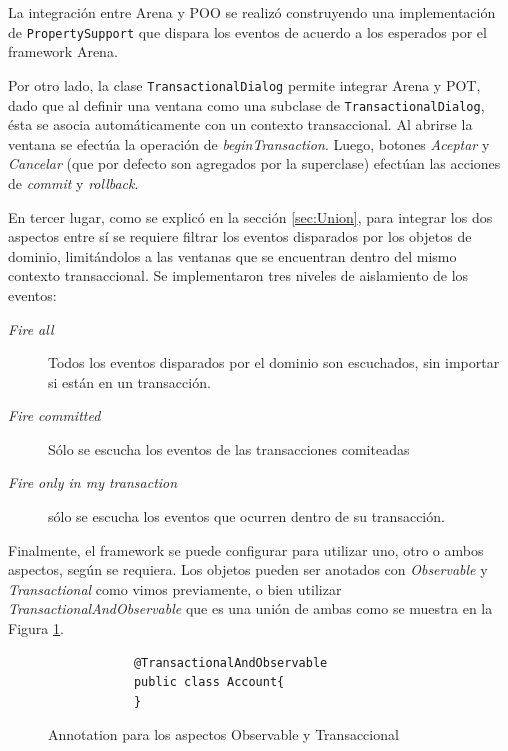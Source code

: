 La integración entre Arena y POO se realizó construyendo una implementación de
\lstinline|PropertySupport| que dispara los eventos de acuerdo a los esperados
por el framework Arena.

\medskip
Por otro lado, la clase \lstinline|TransactionalDialog| permite integrar Arena y
POT, dado que al definir una ventana como una subclase de
\lstinline|TransactionalDialog|, ésta se asocia automáticamente con un
contexto transaccional.
Al abrirse la ventana se efectúa la operación de \emph{beginTransaction}.
Luego, botones \emph{Aceptar} y \emph{Cancelar} (que por defecto son agregados
por la superclase) efectúan las acciones de \emph{commit} y
\emph{rollback}.

\medskip
En tercer lugar, como se explicó en la sección \ref{sec:Union}, para integrar
los dos aspectos entre sí se requiere filtrar los eventos disparados por los objetos de dominio, 
limitándolos a las ventanas que se encuentran dentro del mismo contexto
transaccional. 
Se implementaron tres niveles de aislamiento de los eventos:
\begin{description}
	\item[\emph{Fire all}] Todos los eventos disparados por el dominio son
	escuchados, sin importar si están en un transacción.

	\item[\emph{Fire committed}] Sólo se escucha los eventos de las transacciones
		comiteadas
	
	\item[\emph{Fire only in my transaction}] sólo se escucha los eventos que
		ocurren dentro de su transacción.
 \end{description}
 
\medskip
Finalmente, el framework se puede configurar para utilizar uno, otro o ambos
aspectos, según se requiera.
Los objetos pueden ser anotados con \emph{Observable} y
\emph{Transactional} como vimos previamente, 
o bien utilizar \emph{TransactionalAndObservable} que es una unión de ambas como se muestra en la Figura \ref{taov}.

	\begin{figure}[hbt]
		\begin{lstlisting} 
			@TransactionalAndObservable
			public class Account{
			}
		\end{lstlisting}
		\caption{Annotation para los aspectos Observable y Transaccional}
		\label{taov}
	\end{figure}



